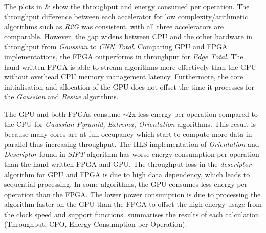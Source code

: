 



The plots in  \&  show the throughput and energy consumed per operation. The throughput difference between each accelerator for low complexity/arithmetic algorithms such as \textit{R2G} was consistent, with all three accelerators are comparable. However, the gap widens between CPU and the other hardware in throughput from \textit{Gaussian} to  \textit{CNN Total}. Comparing GPU and FPGA implementations, the FPGA outperforms in throughput for \textit{Edge Total}. The hand-written FPGA is able to stream algorithms more effectively than the GPU without overhead CPU memory management latency. Furthermore, the core initialisation and allocation of the GPU does not offset the time it processes for the \textit{Gaussian} and \textit{Resize} algorithms. 

The GPU and both FPGAs consume $\sim2$x less energy per operation compared to the CPU for \textit{Gaussian Pyramid, Extrema, Orientation} algorithms. This result is because many cores are at full occupancy which start to compute more data in parallel thus increasing throughput. The HLS implementation of \textit{Orientation} and \textit{Descriptor} found in \textit{SIFT} algorithm has worse energy consumption per operation than the hand-written FPGA and GPU. The throughput loss in the \textit{descriptor} algorithm for GPU and FPGA is due to high data dependency, which leads to sequential processing. In some algorithms, the GPU consumes less energy per operation than the FPGA. The lower power consumption is due to processing the algorithm faster on the GPU than the FPGA to offset the high energy usage from the clock speed and support functions.  summarises the results of each calculation (Throughput, CPO, Energy Consumption per Operation).

